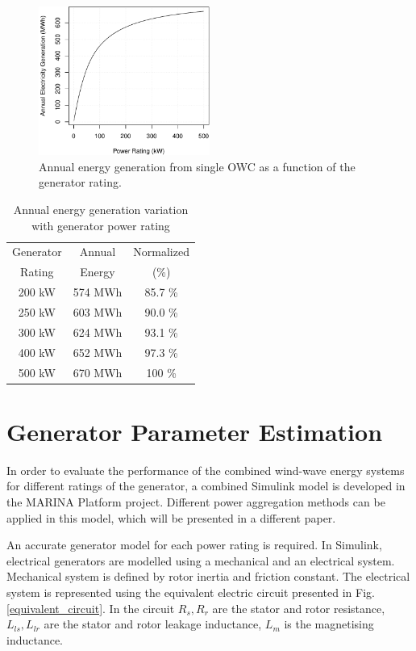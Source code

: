 \documentclass[twocolumn]{article}
\begin{document}
  \begin{figure}[]
    \centering
    \includegraphics[width=0.5\textwidth]{generator_rating}
    \caption{Annual energy generation from single OWC as a function of the generator rating.} 
    \label{generator_rating}
  \end{figure}
  
  \begin{table}[t]
    \centering
    \begin{tabular}{ccc}
     Generator & Annual & Normalized \\
     Rating & Energy & (\%) \\
    \hline
  200 kW & 574 MWh & 85.7 \% \\
  250 kW & 603 MWh & 90.0 \% \\
  300 kW & 624 MWh & 93.1 \% \\
  400 kW & 652 MWh & 97.3 \% \\
  500 kW & 670 MWh & 100 \%\\
  \hline
    \end{tabular}
    \caption{Annual energy generation variation with generator power rating}
    \label{generator_rating_table}
  \end{table}
  

\section{Generator Parameter Estimation}

In order to evaluate the performance of the combined wind-wave energy systems for different ratings of the generator, a combined Simulink model is developed in the MARINA Platform project. Different power aggregation methods can be applied in this model, which will be presented in a different paper.

An accurate generator model for each power rating is required. In Simulink, electrical generators are modelled using a mechanical and an electrical system. Mechanical system is defined by rotor inertia and friction constant. The electrical system is represented using the equivalent electric circuit presented in Fig. \ref{equivalent_circuit}. In the circuit $R_s, R_r$ are the stator and rotor resistance, $L_{ls}, L_{lr}$ are the stator and rotor leakage inductance, $L_m$ is the magnetising inductance.
\end{document}
